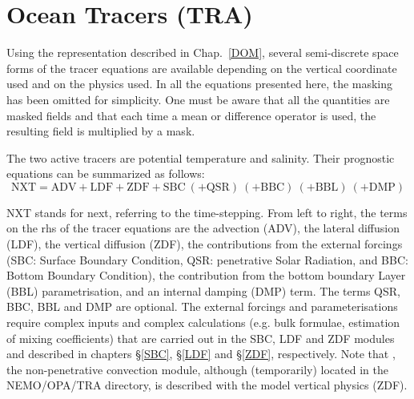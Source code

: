 \chapter{Ocean Tracers (TRA)}
\label{TRA}
\minitoc



\vspace{2.cm}

Using the representation described in Chap.~\ref{DOM}, several semi-discrete 
space forms of the tracer equations are available depending on the vertical 
coordinate used and on the physics used. In all the equations presented 
here, the masking has been omitted for simplicity. One must be aware that 
all the quantities are masked fields and that each time a mean or difference 
operator is used, the resulting field is multiplied by a mask.

The two active tracers are potential temperature and salinity. Their prognostic 
equations can be summarized as follows:
\begin{equation*}
\text{NXT} = \text{ADV}+\text{LDF}+\text{ZDF}+\text{SBC}
                   \ (+\text{QSR})\ (+\text{BBC})\ (+\text{BBL})\ (+\text{DMP})
\end{equation*}

NXT stands for next, referring to the time-stepping. From left to right, the terms 
on the rhs of the tracer equations are the advection (ADV), the lateral diffusion 
(LDF), the vertical diffusion (ZDF), the contributions from the external forcings 
(SBC: Surface Boundary Condition, QSR: penetrative Solar Radiation, and BBC: 
Bottom Boundary Condition), the contribution from the bottom boundary Layer 
(BBL) parametrisation, and an internal damping (DMP) term. The terms QSR, 
BBC, BBL and DMP are optional. The external forcings and parameterisations 
require complex inputs and complex calculations (e.g. bulk formulae, estimation 
of mixing coefficients) that are carried out in the SBC, LDF and ZDF modules and 
described in chapters \S\ref{SBC}, \S\ref{LDF} and  \S\ref{ZDF}, respectively. 
Note that , the non-penetrative convection module,  although 
(temporarily) located in the NEMO/OPA/TRA directory, is described with the 
model vertical physics (ZDF).


